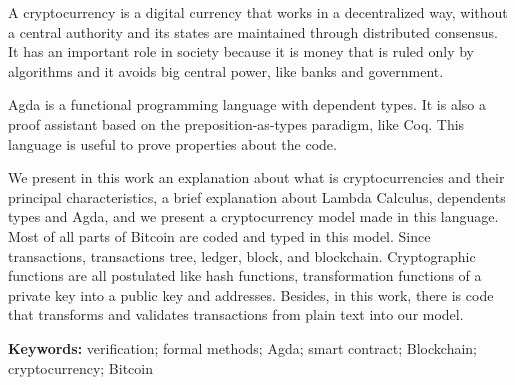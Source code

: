 \subtitle{Abstract}

A cryptocurrency is a digital currency that works in a decentralized way, without a
central authority and its states are maintained through distributed consensus.
It has an important role in society because it is money that is ruled only by algorithms
and it avoids big central power, like banks and government.

Agda is a functional programming language with dependent types.
It is also a proof assistant based on the preposition-as-types paradigm, like Coq.
This language is useful to prove properties about the code.

We present in this work an explanation about what is cryptocurrencies and their principal characteristics,
a brief explanation about Lambda Calculus, dependents types and Agda,
and we present a cryptocurrency model made in this language.
Most of all parts of Bitcoin are coded and typed in this model.
Since transactions, transactions tree, ledger, block, and blockchain.
Cryptographic functions are all postulated like hash functions,
transformation functions of a private key into a public key and addresses.
Besides, in this work, there is code that transforms and validates transactions
from plain text into our model.

{\large \textbf{Keywords:}}  verification; formal methods; Agda; smart contract; Blockchain; cryptocurrency; Bitcoin
